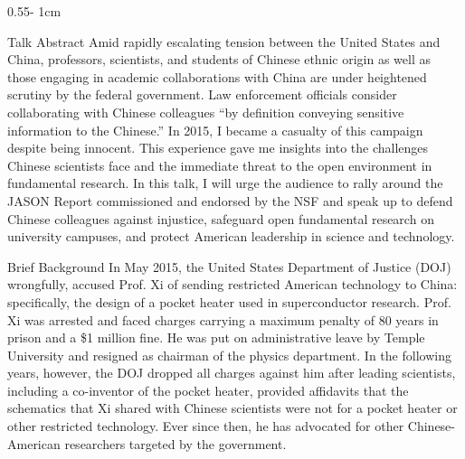 \documentclass{../psuposter}
\begin{document}
\begin{frame}
\begin{columns}[t, totalwidth=\textwidth]
\begin{column}{0.55\textwidth - 1cm}
    \begin{block}{Talk Abstract}
    	Amid rapidly escalating tension between the United States and China, professors, scientists, and students of Chinese ethnic origin as well as those engaging in academic collaborations with China are under heightened scrutiny by the federal government. Law enforcement officials consider collaborating with Chinese colleagues “by definition conveying sensitive information to the Chinese.” In 2015, I became a casualty of this campaign despite being innocent. This experience gave me insights into the challenges Chinese scientists face and the immediate threat to the open environment in fundamental research. In this talk, I will urge the audience to rally around the JASON Report commissioned and endorsed by the NSF and speak up to defend Chinese colleagues against injustice, safeguard open fundamental research on university campuses, and protect American leadership in science and technology.
    \end{block}


    \begin{block}{Brief Background}
    In May 2015, the United States Department of Justice (DOJ) wrongfully, accused Prof. Xi of sending restricted American technology to China: specifically, the design of a pocket heater used in superconductor research. Prof. Xi was arrested and faced charges carrying a maximum penalty of 80 years in prison and a \$1 million fine. He was put on administrative leave by Temple University and resigned as chairman of the physics department. In the following years, however, the DOJ dropped all charges against him after leading scientists, including a co-inventor of the pocket heater, provided affidavits that the schematics that Xi shared with Chinese scientists were not for a pocket heater or other restricted technology. Ever since then, he has advocated for other Chinese-American researchers targeted by the government.
    	

\end{block}
\end{column}
\end{columns}
\end{frame}
\end{document}
